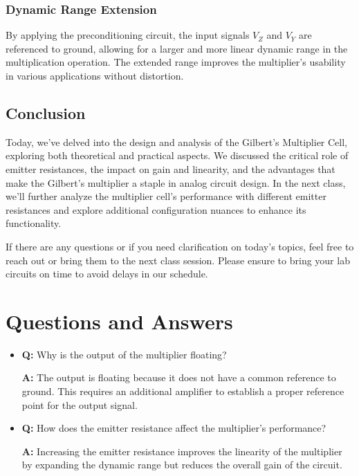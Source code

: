 \subsubsection{Dynamic Range Extension}
By applying the preconditioning circuit, the input signals $V_Z$ and $V_Y$ are referenced to ground, allowing for a larger and more linear dynamic range in the multiplication operation. The extended range improves the multiplier's usability in various applications without distortion.

\subsection{Conclusion}
Today, we've delved into the design and analysis of the Gilbert's Multiplier Cell, exploring both theoretical and practical aspects. We discussed the critical role of emitter resistances, the impact on gain and linearity, and the advantages that make the Gilbert's multiplier a staple in analog circuit design. In the next class, we'll further analyze the multiplier cell's performance with different emitter resistances and explore additional configuration nuances to enhance its functionality.

If there are any questions or if you need clarification on today's topics, feel free to reach out or bring them to the next class session. Please ensure to bring your lab circuits on time to avoid delays in our schedule.

\section*{Questions and Answers}
\begin{itemize}
    \item \textbf{Q:} Why is the output of the multiplier floating?
    
    \textbf{A:} The output is floating because it does not have a common reference to ground. This requires an additional amplifier to establish a proper reference point for the output signal.
    
    \item \textbf{Q:} How does the emitter resistance affect the multiplier's performance?
    
    \textbf{A:} Increasing the emitter resistance improves the linearity of the multiplier by expanding the dynamic range but reduces the overall gain of the circuit.
\end{itemize}

